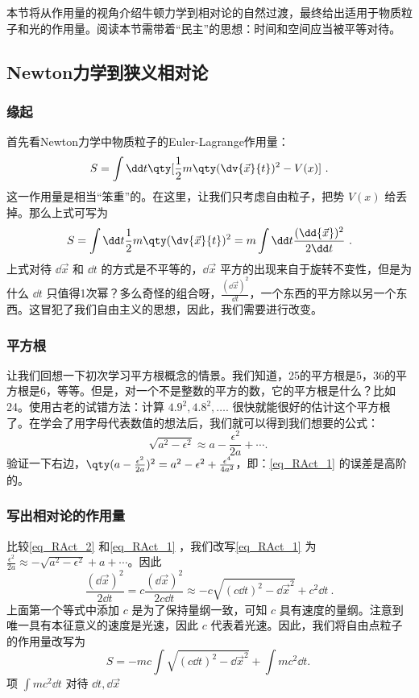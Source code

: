 
本节将从作用量的视角介绍牛顿力学到相对论的自然过渡，最终给出适用于物质粒子和光的作用量。阅读本节需带着“民主”的思想：时间和空间应当被平等对待。
\subsection{Newton力学到狭义相对论}
\subsubsection{缘起}
首先看Newton力学中物质粒子的Euler-Lagrange作用量：
\begin{equation}
S=\int\dd t\qty[\frac{1}{2}m\qty(\dv{\vec x}{t})^2-V(x)]~.
\end{equation}
这一作用量是相当“笨重”的。在这里，让我们只考虑自由粒子，把势 $V(x)$ 给丢掉。那么上式可写为
\begin{equation}\label{eq_RAct_2}
S=\int\dd t\frac{1}{2}m\qty(\dv{\vec x}{t})^2=m\int\dd t\frac{(\dd{\vec x})^2}{2\dd t}~.
\end{equation}
上式对待 $\dd{\vec x}$ 和 $\dd t$ 的方式是不平等的，$\dd{\vec x}$ 平方的出现来自于旋转不变性，但是为什么 $\dd t$ 只值得1次幂？多么奇怪的组合呀，$\frac{(\dd{\vec x})^2}{\dd t}$，一个东西的平方除以另一个东西。这冒犯了我们自由主义的思想，因此，我们需要进行改变。

\subsubsection{平方根}
让我们回想一下初次学习平方根概念的情景。我们知道，25的平方根是5，36的平方根是6，等等。但是，对一个不是整数的平方的数，它的平方根是什么？比如24。使用古老的试错方法：计算 $4.9^2,4.8^2,\ldots.$ 很快就能很好的估计这个平方根了。在学会了用字母代表数值的想法后，我们就可以得到我们想要的公式：
\begin{equation}\label{eq_RAct_1}
\sqrt{a^2-\epsilon^2}\approx a-\frac{\epsilon^2}{2a}+\cdots.~
\end{equation}
验证一下右边，$\qty(a-\frac{\epsilon^2}{2a})^2=a^2-\epsilon^2+\frac{\epsilon^4}{4a^2}$，即：\autoref{eq_RAct_1} 的误差是高阶的。

\subsubsection{写出相对论的作用量}
比较\autoref{eq_RAct_2} 和\autoref{eq_RAct_1} ，我们改写\autoref{eq_RAct_1} 为
$
\frac{\epsilon^2}{2a}\approx-\sqrt{a^2-\epsilon^2}+ a+\cdots
$。因此
\begin{equation}
\frac{(\dd{\vec x})^2}{2\dd t}=c\frac{(\dd{\vec x})^2}{2c\dd t}\approx-c\sqrt{(c\dd t)^2-\dd{\vec x}^2}+c^2\dd t~.
\end{equation}
上面第一个等式中添加 $c$ 是为了保持量纲一致，可知 $c$ 具有速度的量纲。注意到唯一具有本征意义的速度是光速，因此 $c$ 代表着光速。因此，我们将自由点粒子的作用量改写为
\begin{equation}
S=-mc\int \sqrt{(c\dd t)^2-\dd{\vec x}^2}+\int mc^2\dd t.~
\end{equation}
项 $\int mc^2\dd t $ 对待 $\dd t,\dd{\vec x}$



